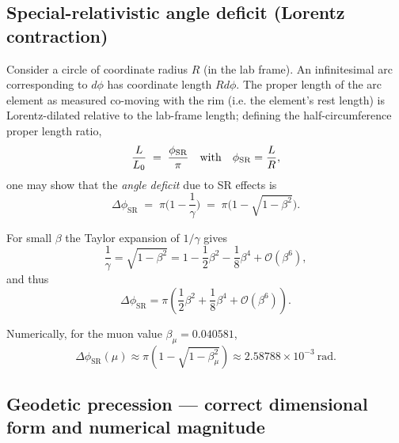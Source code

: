 \documentclass[%
 reprint,
 amsmath,amssymb,
 aps,
]{revtex4-1}
\numberwithin{equation}{section}
\begin{document}
\subsection{Special-relativistic angle deficit (Lorentz contraction)}

Consider a circle of coordinate radius $R$ (in the lab frame). An infinitesimal arc corresponding to $d\phi$ has coordinate length $Rd\phi$. The proper length of the arc element as measured co-moving with the rim (i.e. the element's rest length) is Lorentz-dilated relative to the lab-frame length; defining the half-circumference proper length ratio,
\begin{equation}
\frac{L}{L_0} \;=\; \frac{\phi_{\rm SR}}{\pi}
\quad\text{with}\quad
\phi_{\rm SR}=\frac{L}{R},
\label{eq:length_angle_relation}
\end{equation}
one may show that the \emph{angle deficit} due to SR effects is
\begin{equation}
\Delta\phi_{\mathrm{SR}} \;=\; \pi\Big(1-\frac{1}{\gamma}\Big)
\;=\; \pi\Big(1-\sqrt{1-\beta^{2}}\Big).
\label{eq:delta_phi_SR}
\end{equation}

For small $\beta$ the Taylor expansion of $1/\gamma$ gives
\begin{equation}
\frac{1}{\gamma}=\sqrt{1-\beta^{2}}=1-\frac{1}{2}\beta^{2}-\frac{1}{8}\beta^{4}+\mathcal{O}(\beta^{6}),
\label{eq:gamma_series}
\end{equation}
and thus
\begin{equation}
\Delta\phi_{\mathrm{SR}}=\pi\left(\frac{1}{2}\beta^{2}+\frac{1}{8}\beta^{4}+\mathcal{O}(\beta^{6})\right).
\label{eq:delta_phi_SR_series}
\end{equation}

Numerically, for the muon value $\beta_{\mu}=0.040581$,
\begin{equation}
\Delta\phi_{\mathrm{SR}}(\mu) \approx \pi\left(1-\sqrt{1-\beta_{\mu}^{2}}\right)
\approx 2.58788\times 10^{-3}\ \text{rad}.
\label{eq:delta_phi_SR_mu_num}
\end{equation}

\subsection{Geodetic precession --- correct dimensional form and numerical magnitude}
\end{document}
